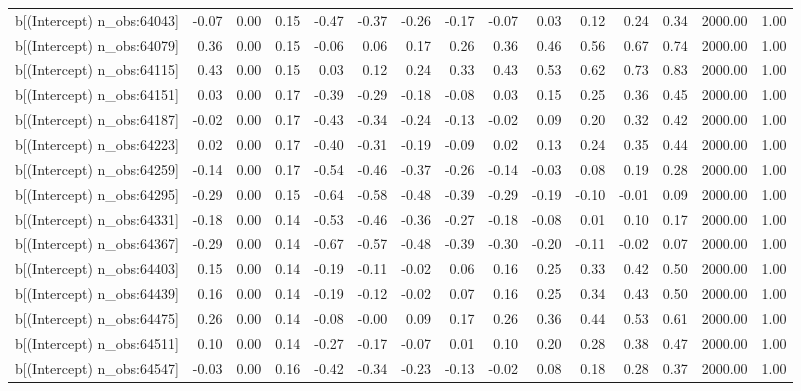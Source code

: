 \begin{table}[ht]
\begin{tabular}{rrrrrrrrrrrrrrr}
  b[(Intercept) n\_obs:64043] & -0.07 & 0.00 & 0.15 & -0.47 & -0.37 & -0.26 & -0.17 & -0.07 & 0.03 & 0.12 & 0.24 & 0.34 & 2000.00 & 1.00 \\ 
  b[(Intercept) n\_obs:64079] & 0.36 & 0.00 & 0.15 & -0.06 & 0.06 & 0.17 & 0.26 & 0.36 & 0.46 & 0.56 & 0.67 & 0.74 & 2000.00 & 1.00 \\ 
  b[(Intercept) n\_obs:64115] & 0.43 & 0.00 & 0.15 & 0.03 & 0.12 & 0.24 & 0.33 & 0.43 & 0.53 & 0.62 & 0.73 & 0.83 & 2000.00 & 1.00 \\ 
  b[(Intercept) n\_obs:64151] & 0.03 & 0.00 & 0.17 & -0.39 & -0.29 & -0.18 & -0.08 & 0.03 & 0.15 & 0.25 & 0.36 & 0.45 & 2000.00 & 1.00 \\ 
  b[(Intercept) n\_obs:64187] & -0.02 & 0.00 & 0.17 & -0.43 & -0.34 & -0.24 & -0.13 & -0.02 & 0.09 & 0.20 & 0.32 & 0.42 & 2000.00 & 1.00 \\ 
  b[(Intercept) n\_obs:64223] & 0.02 & 0.00 & 0.17 & -0.40 & -0.31 & -0.19 & -0.09 & 0.02 & 0.13 & 0.24 & 0.35 & 0.44 & 2000.00 & 1.00 \\ 
  b[(Intercept) n\_obs:64259] & -0.14 & 0.00 & 0.17 & -0.54 & -0.46 & -0.37 & -0.26 & -0.14 & -0.03 & 0.08 & 0.19 & 0.28 & 2000.00 & 1.00 \\ 
  b[(Intercept) n\_obs:64295] & -0.29 & 0.00 & 0.15 & -0.64 & -0.58 & -0.48 & -0.39 & -0.29 & -0.19 & -0.10 & -0.01 & 0.09 & 2000.00 & 1.00 \\ 
  b[(Intercept) n\_obs:64331] & -0.18 & 0.00 & 0.14 & -0.53 & -0.46 & -0.36 & -0.27 & -0.18 & -0.08 & 0.01 & 0.10 & 0.17 & 2000.00 & 1.00 \\ 
  b[(Intercept) n\_obs:64367] & -0.29 & 0.00 & 0.14 & -0.67 & -0.57 & -0.48 & -0.39 & -0.30 & -0.20 & -0.11 & -0.02 & 0.07 & 2000.00 & 1.00 \\ 
  b[(Intercept) n\_obs:64403] & 0.15 & 0.00 & 0.14 & -0.19 & -0.11 & -0.02 & 0.06 & 0.16 & 0.25 & 0.33 & 0.42 & 0.50 & 2000.00 & 1.00 \\ 
  b[(Intercept) n\_obs:64439] & 0.16 & 0.00 & 0.14 & -0.19 & -0.12 & -0.02 & 0.07 & 0.16 & 0.25 & 0.34 & 0.43 & 0.50 & 2000.00 & 1.00 \\ 
  b[(Intercept) n\_obs:64475] & 0.26 & 0.00 & 0.14 & -0.08 & -0.00 & 0.09 & 0.17 & 0.26 & 0.36 & 0.44 & 0.53 & 0.61 & 2000.00 & 1.00 \\ 
  b[(Intercept) n\_obs:64511] & 0.10 & 0.00 & 0.14 & -0.27 & -0.17 & -0.07 & 0.01 & 0.10 & 0.20 & 0.28 & 0.38 & 0.47 & 2000.00 & 1.00 \\ 
  b[(Intercept) n\_obs:64547] & -0.03 & 0.00 & 0.16 & -0.42 & -0.34 & -0.23 & -0.13 & -0.02 & 0.08 & 0.18 & 0.28 & 0.37 & 2000.00 & 1.00 \\ 

\end{tabular}
\end{table}

